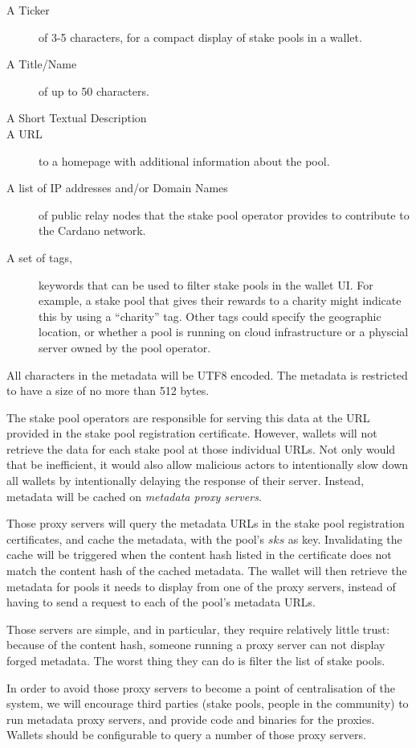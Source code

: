 \documentclass[11pt,a4paper]{article}
\begin{document}
\begin{description}
\item[A Ticker]
  of 3-5 characters, for a compact display of stake pools in a
  wallet.
\item[A Title/Name]
  of up to 50 characters.
\item[A Short Textual Description]
\item[A URL]
  to a homepage with additional information about the pool.
\item[A list of IP addresses and/or Domain Names]
  of public relay nodes that the stake pool operator provides to contribute to
  the Cardano network.
\item[A set of tags,]
  keywords that can be used to filter stake pools in the wallet UI. For example,
  a stake pool that gives their rewards to a charity might indicate this by
  using a ``charity'' tag. Other tags could specify the geographic location, or
  whether a pool is running on cloud infrastructure or a physcial server owned
  by the pool operator.
\end{description}
All characters in the metadata will be UTF8 encoded. The metadata is restricted
to have a size of no more than 512 bytes.

The stake pool operators are responsible for serving this data at the URL
provided in the stake pool registration certificate. However, wallets will not
retrieve the data for each stake pool at those individual URLs. Not only would
that be inefficient, it would also allow malicious actors to intentionally slow
down all wallets by intentionally delaying the response of their server.
Instead, metadata will be cached on \emph{metadata proxy servers}.

Those proxy servers will query the metadata URLs in the stake pool registration
certificates, and cache the metadata, with the pool's \(sks\) as key.
Invalidating the cache will be triggered when the content hash listed in the
certificate does not match the content hash of the cached metadata. The wallet
will then retrieve the metadata for pools it needs to display from one of the
proxy servers, instead of having to send a request to each of the pool's
metadata URLs.

Those servers are simple, and in particular, they require relatively little
trust: because of the content hash, someone running a proxy server can not
display forged metadata. The worst thing they can do is filter the list of stake
pools.

In order to avoid those proxy servers to become a point of centralisation of the
system, we will encourage third parties (stake pools, people in the community)
to run metadata proxy servers, and provide code and binaries for the proxies.
Wallets should be configurable to query a number of those proxy servers.
\end{document}
